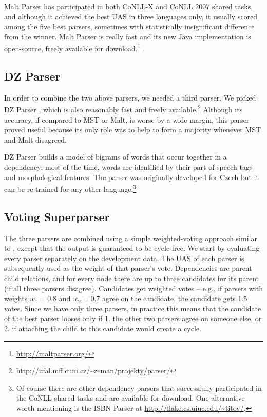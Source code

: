 \documentclass[11pt]{article}
\def\microsection#1{{\bf #1.}}
\begin{document}
Malt Parser has participated in both CoNLL-X and CoNLL 2007 shared tasks, and although it achieved the best UAS in three languages only, it usually scored among the five best parsers, sometimes with statistically insignificant difference from the winner. Malt Parser is really fast and its new Java implementation is open-source, freely available for download.\footnote{\url{http://maltparser.org/}}

\subsection{DZ Parser}
\label{sec:dz}
In order to combine the two above parsers, we needed a third parser. We picked DZ Parser \citep{dzparser}, which is also reasonably fast and freely available.\footnote{\url{http://ufal.mff.cuni.cz/~zeman/projekty/parser/}} Although its accuracy, if compared to MST or Malt, is worse by a wide margin, this parser proved useful because its only role was to help to form a majority whenever MST and Malt disagreed.

DZ Parser builds a model of bigrams of words that occur together in a dependency; most of the time, words are identified by their part of speech tags and morphological features. The parser was originally developed for Czech but it can be re-trained for any other language.\footnote{Of course there are other dependency parsers that successfully participated in the CoNLL shared tasks and are available for download. One alternative worth mentioning is the ISBN Parser \citep{titov-henderson:2007:EMNLP-CoNLL2007} at \url{http://flake.cs.uiuc.edu/~titov/}.}

\subsection{Voting Superparser}
\label{sec:voting}
The three parsers are combined using a simple weighted-voting approach similar to \citet{biblio:ZeZaImprovingParsing2005}, except that the output is guaranteed to be cycle-free. We start by evaluating every parser separately on the development data. The UAS of each parser is subsequently used as the weight of that parser's vote. Dependencies are parent-child relations, and for every node there are up to three candidates for its parent (if all three parsers disagree). Candidates get weighted votes -- e.g., if parsers with weights $w_1 = 0.8$ and $w_2 = 0.7$ agree on the candidate, the candidate gets 1.5 votes. Since we have only three parsers, in practice this means that the candidate of the best parser looses only if 1. the other two parsers agree on someone else, or 2. if attaching the child to this candidate would create a cycle.
\end{document}
